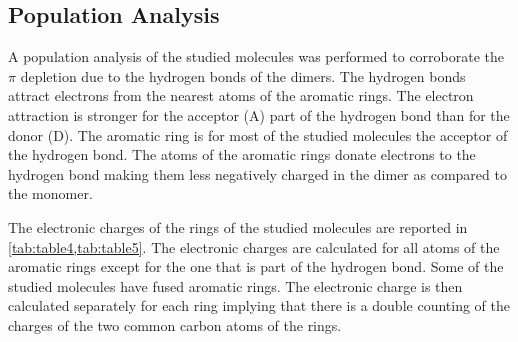 \documentclass[twoside,twocolumn,9pt]{article}
\begin{document}
\subsection{Population Analysis}

A population analysis of the studied molecules was performed to corroborate the
$\pi$ depletion due to the hydrogen bonds of the dimers.  The hydrogen bonds
attract electrons from the nearest atoms of the aromatic rings. The electron
attraction is stronger for the acceptor (A) part of the hydrogen bond than for
the donor (D). The aromatic ring is for most of the studied molecules the
acceptor of the hydrogen bond. The atoms of the aromatic rings donate electrons
to the hydrogen bond making them less negatively charged in the dimer as
compared to the monomer.

The electronic charges of the rings of the studied molecules are reported in
\cref{tab:table4,tab:table5}. The electronic charges are calculated for all
atoms of the aromatic rings except for the one that is part of the hydrogen
bond.  Some of the studied molecules have fused aromatic rings.  The electronic
charge is then calculated separately for each ring implying that there is a
double counting of the charges of the two common carbon atoms of the rings. 
\end{document}

